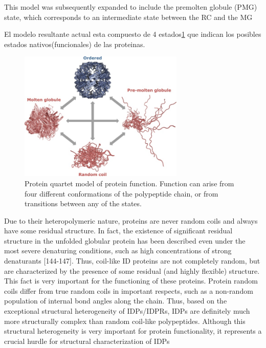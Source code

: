 
This model was subsequently expanded to include the premolten globule (PMG) state, which corresponds to an intermediate state between the RC and the MG

El modelo resultante actual esta compuesto de 4 estados\ref{proteinQuartet} que indican los posibles estados nativos(funcionales) de las proteinas.



\begin{figure}[htbp]
\centering
\includegraphics[width=0.7\textwidth]{img/proteinQuartet.jpg} 
\caption{Protein quartet model of protein function. Function can arise
from four different conformations of the polypeptide chain, or from
transitions between any of the states. \cite{uversky2002natively}}
\label{proteinQuartet}
\end{figure}





Due to their heteropolymeric nature, proteins are never random coils and always have some residual structure.
In fact, the existence of significant residual structure in the unfolded globular protein has been described even under the most
severe denaturing conditions, such as high concentrations of strong denaturants [144-147]. Thus, coil-like ID proteins are not completely random, but are characterized by the presence
of some residual (and highly flexible) structure. This fact is very important for the functioning of these proteins.
Protein random coils differ from true random coils in important respects, such as a non-random population of internal bond angles along the chain.
Thus, based on the exceptional structural heterogeneity of IDPs/IDPRs, IDPs are definitely much more structurally complex than random coil-like polypeptides.
Although this structural heterogeneity is very important for protein functionality, it represents a crucial hurdle for structural characterization of IDPs

